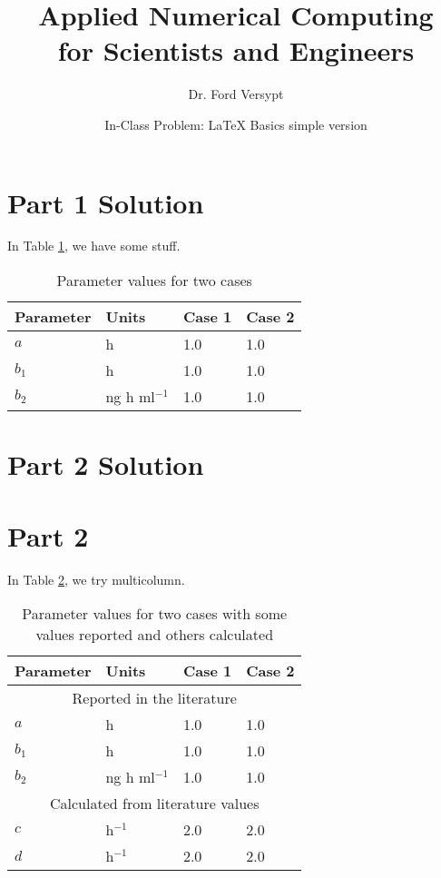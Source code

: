 \documentclass[12pt]{article}
\title{Applied Numerical Computing\\ for Scientists and Engineers}
\author{Dr. Ford Versypt}
\date{In-Class Problem: \LaTeX{} Basics simple version}
\begin{document}
\maketitle

\section{Part 1 Solution}
In Table \ref{table:simple}, we have some stuff.

\begin{table}[htbp]
\begin{center}
\caption{Parameter values for two cases} 
\begin{tabular}{llll}
\toprule
Parameter & Units & Case 1 & Case 2 \\
\midrule
$a$ & h & 1.0 & 1.0 \\
$b_1$ & h & 1.0 & 1.0 \\
$b_2$ & ng h ml$^{-1}$ & 1.0 & 1.0 \\
\bottomrule
\end{tabular} 
\label{table:simple} 
\end{center}
\end{table}

\section{Part 2 Solution}
\section{Part 2}
In Table \ref{table:multicolumn}, we try multicolumn.

\begin{table}[htbp]
\begin{center}
\caption{Parameter values for two cases with some values reported and others calculated}
\begin{tabular}{llll}\toprule
Parameter & Units & Case 1 & Case 2 \\ \midrule
\multicolumn{4}{c}{Reported in the literature}\\ \midrule
$a$ & h & 1.0 & 1.0 \\
$b_1$ & h & 1.0  & 1.0 \\
$b_2$ & ng h ml$^{-1}$ & 1.0 & 1.0 \\ \midrule
\multicolumn{4}{c}{Calculated from literature values}\\ \midrule
$c$ & h$^{-1}$ & 2.0 & 2.0  \\
$d$ & h$^{-1}$ & 2.0 & 2.0 \\
\bottomrule
\end{tabular}
\label{table:multicolumn}
\end{center}
\end{table}  
\end{document}
